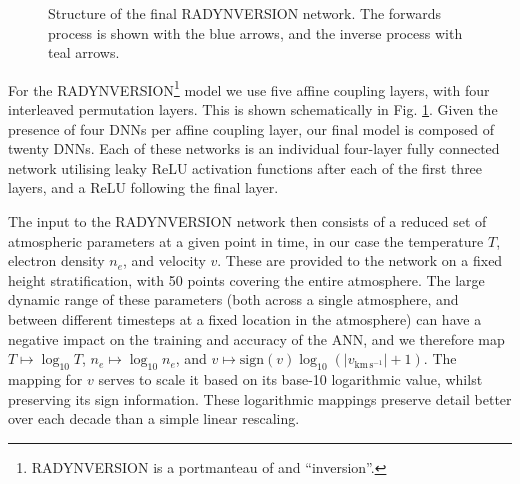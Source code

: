 \begin{figure}[htbp]
\caption{Structure of the final RADYNVERSION network. The forwards process is shown with the {\color{TolBlue}blue} arrows, and the inverse process with {\color{TolTeal}teal} arrows.}
\label{Fig:RadynversionDiagram}
\end{figure}

For the RADYNVERSION\footnote{RADYNVERSION is a portmanteau of \Radyn{} and ``inversion''.} model we use five affine coupling layers, with four interleaved permutation layers.
This is shown schematically in Fig. \ref{Fig:RadynversionDiagram}.
Given the presence of four DNNs per affine coupling layer, our final model is composed of twenty DNNs.
Each of these networks is an individual four-layer fully connected network utilising leaky ReLU activation functions after each of the first three layers, and a ReLU following the final layer.

The input to the RADYNVERSION network then consists of a reduced set of atmospheric parameters at a given point in time, in our case the temperature $T$, electron density $n_e$, and velocity $v$.
These are provided to the network on a fixed height stratification, with 50 points covering the entire atmosphere.
The large dynamic range of these parameters (both across a single atmosphere, and between different timesteps at a fixed location in the atmosphere) can have a negative impact on the training and accuracy of the ANN, and we therefore map $T\mapsto\log_{10} T$, $n_e\mapsto\log_{10} n_e$, and $v\mapsto\mathrm{sign}(v)\log_{10} \left( |v_{\mathrm{km\, s^{-1}}}| + 1\right)$.
The mapping for $v$ serves to scale it based on its base-10 logarithmic value, whilst preserving its sign information.
These logarithmic mappings preserve detail better over each decade than a simple linear rescaling.


